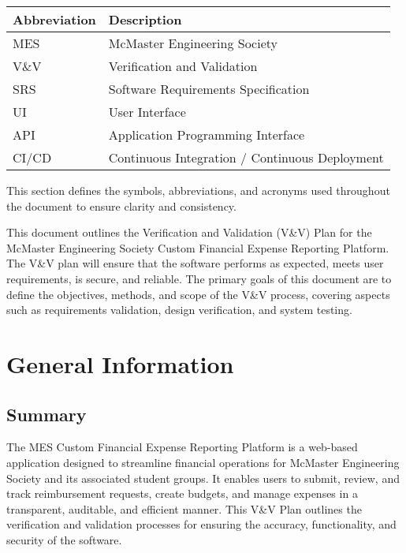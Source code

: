 \documentclass[12pt, titlepage]{article}
\begin{document}
\renewcommand{\arraystretch}{1.2}
\begin{tabular}{|p{3cm}|p{10cm}|}
    \hline
    \textbf{Abbreviation} & \textbf{Description} \\
    \hline
    MES & McMaster Engineering Society \\
    \hline
    V\&V & Verification and Validation \\
    \hline
    SRS & Software Requirements Specification \\
    \hline
    UI & User Interface \\
    \hline
    API & Application Programming Interface \\
    \hline
    CI/CD & Continuous Integration / Continuous Deployment \\
    \hline
\end{tabular}

\bigskip

This section defines the symbols, abbreviations, and acronyms used throughout the document to ensure clarity and consistency.


\newpage


This document outlines the Verification and Validation (V\&V) Plan for the McMaster Engineering Society Custom Financial Expense Reporting Platform. The V\&V plan will ensure that the software performs as expected, meets user requirements, is secure, and reliable. The primary goals of this document are to define the objectives, methods, and scope of the V\&V process, covering aspects such as requirements validation, design verification, and system testing.

\section{General Information}

\subsection{Summary}

The MES Custom Financial Expense Reporting Platform is a web-based application designed to streamline financial operations for McMaster Engineering Society and its associated student groups. It enables users to submit, review, and track reimbursement requests, create budgets, and manage expenses in a transparent, auditable, and efficient manner. This V\&V Plan outlines the verification and validation processes for ensuring the accuracy, functionality, and security of the software.
\end{document}
